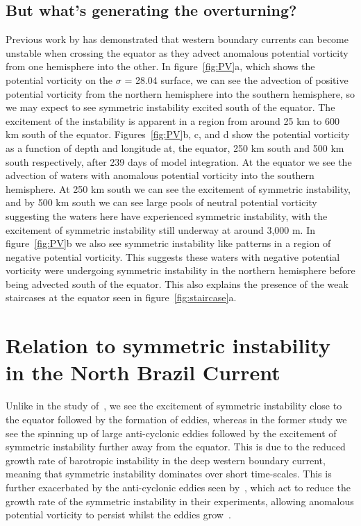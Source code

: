 \subsection{But what's generating the overturning?}
 Previous work by \citet{Goldsworth2021a} has demonstrated that western boundary currents can become unstable when crossing the equator as they advect anomalous potential vorticity from one hemisphere into the other. In figure~\ref{fig:PV}a, which shows the potential vorticity on the $\sigma$ = 28.04 surface, we can see the advection of positive potential vorticity from the northern hemisphere into the southern hemisphere, so we may expect to see symmetric instability excited south of the equator. The excitement of the instability is apparent in a region from around 25 km to 600 km south of the equator. Figures~\ref{fig:PV}b, c, and d show the potential vorticity as a function of depth and longitude at, the equator, 250 km south and 500 km south respectively, after 239 days of model integration. At the equator we see the advection of waters with anomalous potential vorticity into the southern hemisphere. At 250 km south we can see the excitement of symmetric instability, and by 500 km south we can see large pools of neutral potential vorticity suggesting the waters here have experienced symmetric instability, with the excitement of symmetric instability still underway at around 3,000 m. In figure~\ref{fig:PV}b we also see symmetric instability like patterns in a region of negative potential vorticity. This suggests these waters with negative potential vorticity were undergoing symmetric instability in the northern hemisphere  before being advected south of the equator. This also explains the presence of the weak staircases at the equator seen in figure~\ref{fig:staircase}a.

\section{Relation to symmetric instability in the North Brazil Current}
\label{sec:relation2nbc}
Unlike in the study of~\citet{Goldsworth2021a}, we see the excitement of symmetric instability close to the equator followed by the formation of eddies, whereas in the former study we see the spinning up of large anti-cyclonic eddies followed by the excitement of symmetric instability further away from the equator. This is due to the reduced growth rate of barotropic instability in the deep western boundary current, meaning that symmetric instability dominates over short time-scales. This is further exacerbated by the anti-cyclonic eddies seen by~\citet{Goldsworth2021a}, which act to reduce the growth rate of the symmetric instability in their experiments, allowing anomalous potential vorticity to persist whilst the eddies grow~\cite{Buckingham2021}. 

